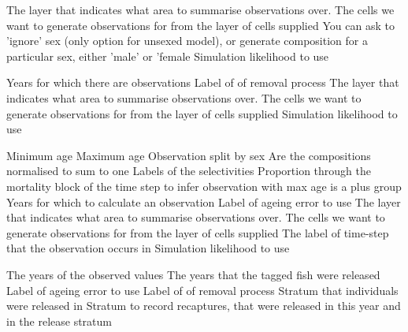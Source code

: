  {The layer that indicates what area to summarise observations over.}
 {The cells we want to generate observations for from the layer of cells supplied}
 {You can ask to 'ignore' sex (only option for unsexed model), or generate composition for a particular sex, either 'male' or 'female}
 {Simulation likelihood to use}
\par\textbf{}\par
{} {Years for which there are observations}
 {Label of of removal process}
 {The layer that indicates what area to summarise observations over.}
 {The cells we want to generate observations for from the layer of cells supplied}
 {Simulation likelihood to use}
\par\textbf{}\par
{} {Minimum age}
 {Maximum age}
 {Observation split by sex}
 {Are the compositions normalised to sum to one}
 {Labels of the selectivities}
 {Proportion through the mortality block of the time step to infer observation with}
 {max age is a plus group}
 {Years for which to calculate an observation}
 {Label of ageing error to use}
 {The layer that indicates what area to summarise observations over.}
 {The cells we want to generate observations for from the layer of cells supplied}
 {The label of time-step that the observation occurs in}
 {Simulation likelihood to use}
\par\textbf{}\par
{} {The years of the observed values}
 {The years that the tagged fish were released}
 {Label of ageing error to use}
 {Label of of removal process}
 {Stratum that individuals were released in}
 {Stratum to record recaptures, that were released in this year and in the release stratum}
\par\textbf{}\par
